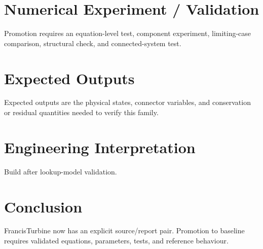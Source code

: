 \documentclass[10pt,a4paper]{article}
\begin{document}
\section{Numerical Experiment / Validation}Promotion requires an equation-level test, component experiment, limiting-case comparison, structural check, and connected-system test.
\section{Expected Outputs}Expected outputs are the physical states, connector variables, and conservation or residual quantities needed to verify this family.
\section{Engineering Interpretation}Build after lookup-model validation.
\section*{Conclusion}FrancisTurbine now has an explicit source/report pair. Promotion to baseline requires validated equations, parameters, tests, and reference behaviour.
\end{document}
